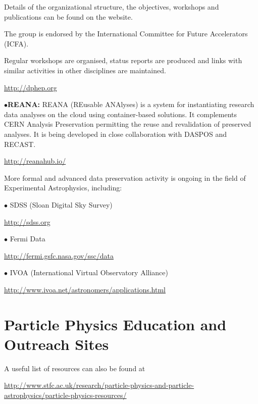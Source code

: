 \item{}Details of the organizational structure, the objectives, workshops and publications can be found on the website. 

\item{}The group is endorsed by the International Committee for Future Accelerators (ICFA).

\item{}Regular workshops are organised, status reports are produced and links with similar activities in other disciplines are maintained.

	\item{}\qquad\url{http://dphep.org}

\medskip

\item{$\bullet$}{\bf REANA:} 
REANA (REusable ANAlyses) is a system for instantiating research data analyses on the cloud using container-based solutions. It complements CERN Analysis Preservation permitting the reuse and revalidation of preserved analyses. It is being developed in close collaboration with DASPOS and RECAST.
	\item{}\qquad\url{http://reanahub.io/}


\medskip
\medskip


\medskip

More formal and advanced data preservation activity is ongoing in the field of Experimental Astrophysics, including:
\item{$\bullet$}
SDSS (Sloan Digital Sky Survey) \item{}\qquad\url{http://sdss.org}
\item{$\bullet$}
Fermi Data\item{}\qquad\url{http://fermi.gsfc.nasa.gov/ssc/data} 
\medskip

\item{$\bullet$}
IVOA (International Virtual Observatory Alliance) \item{}\qquad\url{http://www.ivoa.net/astronomers/applications.html}
\medskip


\section{Particle Physics Education and Outreach Sites}  %

\medskip

A useful list of resources can also be found at
	\item{}\qquad\url{http://www.stfc.ac.uk/research/particle-physics-and-particle-astrophysics/particle-physics-resources/}


